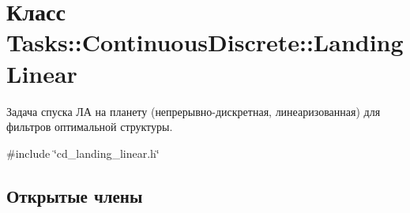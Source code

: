 \hypertarget{class_tasks_1_1_continuous_discrete_1_1_landing_linear}{}\section{Класс Tasks\+:\+:Continuous\+Discrete\+:\+:Landing\+Linear}
\label{class_tasks_1_1_continuous_discrete_1_1_landing_linear}


Задача спуска ЛА на планету (непрерывно-\/дискретная, линеаризованная) для фильтров оптимальной структуры.  




{\ttfamily \#include \char`\"{}cd\+\_\+landing\+\_\+linear.\+h\char`\"{}}

\subsection*{Открытые члены}
